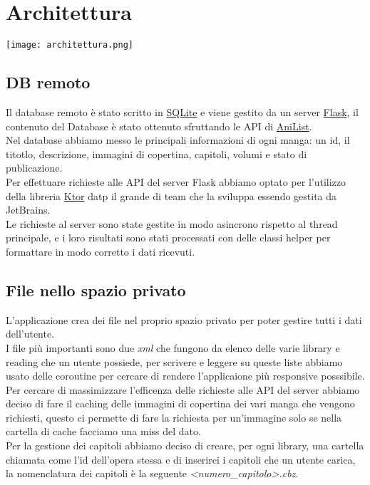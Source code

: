 \documentclass[../Assignment-3-LPSMT.tex]{subfiles}
\begin{document}
\chapter{Architettura}

\begin{center}
  \texttt{[image: architettura.png]}
\end{center}

\section{DB remoto}

Il database remoto è stato scritto in \href{https://www.sqlite.org/index.html}{SQLite} e viene gestito da un server \href{https://flask.palletsprojects.com/en/2.3.x/}{Flask}, il contenuto del Database è stato ottenuto sfruttando le API di \href{https://anilist.gitbook.io/anilist-apiv2-docs/}{AniList}.\\
Nel database abbiamo messo le principali informazioni di ogni manga: un id, il titotlo, descrizione, immagini di copertina, capitoli, volumi e stato di publicazione.\\
Per effettuare richieste alle API del server Flask abbiamo optato per l'utilizzo della libreria \href{https://ktor.io/}{Ktor} datp il grande di team che la sviluppa essendo gestita da JetBrains.\\
Le richieste al server sono state gestite in modo asincrono rispetto al thread principale, e i loro risultati sono stati processati con delle classi helper per formattare in modo corretto i dati ricevuti.\\

\section{File nello spazio privato}

L'applicazione crea dei file nel proprio spazio privato per poter gestire tutti i dati dell'utente.\\
I file più importanti sono due \emph{xml} che fungono da elenco delle varie library e reading che un utente possiede, per scrivere e leggere su queste liste abbiamo usato delle coroutine per cercare di rendere l'applicaione più responsive posssibile.\\
Per cercare di massimizzare l'efficenza delle richieste alle API del server abbiamo deciso di fare il caching delle immagini di copertina dei vari manga che vengono richiesti, questo ci permette di fare la richiesta per un'immagine solo se nella cartella di cache facciamo una miss del dato.\\
Per la gestione dei capitoli abbiamo deciso di creare, per ogni library, una cartella chiamata come l'id dell'opera stessa e di inserirci i capitoli che un utente carica, la nomenclatura dei capitoli è la seguente \emph{<numero\_capitolo>.cbz}.
\end{document}
